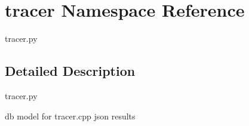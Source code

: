 \hypertarget{namespacetracer}{}\section{tracer Namespace Reference}
\label{namespacetracer}


tracer.\+py  




\subsection{Detailed Description}
tracer.\+py 

db model for tracer.\+cpp json results 
